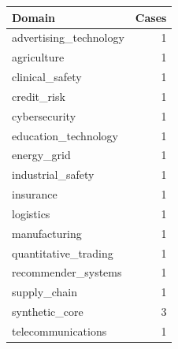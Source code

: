 \begin{tabular}{lr}
\toprule
Domain & Cases \\
\midrule
advertising\_technology & 1 \\
agriculture & 1 \\
clinical\_safety & 1 \\
credit\_risk & 1 \\
cybersecurity & 1 \\
education\_technology & 1 \\
energy\_grid & 1 \\
industrial\_safety & 1 \\
insurance & 1 \\
logistics & 1 \\
manufacturing & 1 \\
quantitative\_trading & 1 \\
recommender\_systems & 1 \\
supply\_chain & 1 \\
synthetic\_core & 3 \\
telecommunications & 1 \\
\bottomrule
\end{tabular}
